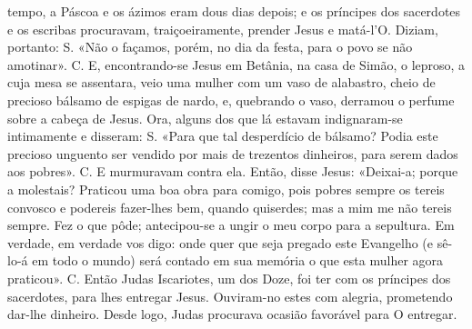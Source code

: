 \begin{paracol}{2}
{ tempo, a Páscoa e os ázimos eram dous dias depois; e os príncipes dos sacerdotes e os escribas procuravam, traiçoeiramente, prender Jesus e matá-l’O. Diziam, portanto: {\redx S.} «Não o façamos, porém, no dia da festa, para o povo se não amotinar». {\redx C.} E, encontrando-se Jesus em Betânia, na casa de Simão, o leproso, a cuja mesa se assentara, veio uma mulher com um vaso de alabastro, cheio de precioso bálsamo de espigas de nardo, e, quebrando o vaso, derramou o perfume sobre a cabeça de Jesus. Ora, alguns dos que lá estavam indignaram-se intimamente e disseram: {\redx S.} «Para que tal desperdício de bálsamo? Podia este precioso unguento ser vendido por mais de trezentos dinheiros, para serem dados aos pobres». {\redx C.} E murmuravam contra ela. Então, disse Jesus: \cruz «Deixai-a; porque a molestais? Praticou uma boa obra para comigo, pois pobres sempre os tereis convosco e podereis fazer-lhes bem, quando quiserdes; mas a mim me não tereis sempre. Fez o que pôde; antecipou-se a ungir o meu corpo para a sepultura. Em verdade, em verdade vos digo: onde quer que seja pregado este Evangelho (e sê-lo-á em todo o mundo) será contado em sua memória o que esta mulher agora praticou». {\redx C.} Então Judas Iscariotes, um dos Doze, foi ter com os príncipes dos sacerdotes, para lhes entregar Jesus. Ouviram-no estes com alegria, prometendo dar-lhe dinheiro. Desde logo, Judas procurava ocasião favorável para O entregar.
}\switchcolumn*{}\switchcolumn{}
\end{paracol}
